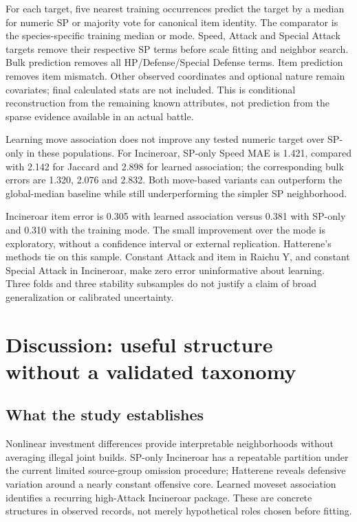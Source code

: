 \documentclass[10pt,a4paper]{article}
\begin{document}
For each target, five nearest training occurrences predict the target by a median for numeric SP or majority vote for canonical item identity. The comparator is the species-specific training median or mode. Speed, Attack and Special Attack targets remove their respective SP terms before scale fitting and neighbor search. Bulk prediction removes all HP/Defense/Special Defense terms. Item prediction removes item mismatch. Other observed coordinates and optional nature remain covariates; final calculated stats are not included. This is conditional reconstruction from the remaining known attributes, not prediction from the sparse evidence available in an actual battle.

\begin{table}[!ht]\centering\small
\caption{Three-fold grouped holdout errors. Numeric columns are mean absolute errors in SP units; the last column is a categorical item-identity error rate, not an SP error. Every method evaluates 13 Hatterene (13 groups), 197 Incineroar (192 groups) and 72 Raichu Y (70 groups) occurrences.}
\resizebox{\linewidth}{!}{\HoldoutTable}
\end{table}
Learning move association does not improve any tested numeric target over SP-only in these populations. For Incineroar, SP-only Speed MAE is 1.421, compared with 2.142 for Jaccard and 2.898 for learned association; the corresponding bulk errors are 1.320, 2.076 and 2.832. Both move-based variants can outperform the global-median baseline while still underperforming the simpler SP neighborhood.

Incineroar item error is 0.305 with learned association versus 0.381 with SP-only and 0.310 with the training mode. The small improvement over the mode is exploratory, without a confidence interval or external replication. Hatterene's methods tie on this sample. Constant Attack and item in Raichu Y, and constant Special Attack in Incineroar, make zero error uninformative about learning. Three folds and three stability subsamples do not justify a claim of broad generalization or calibrated uncertainty.
\clearpage

\section{Discussion: useful structure without a validated taxonomy}
\subsection{What the study establishes}
Nonlinear investment differences provide interpretable neighborhoods without averaging illegal joint builds. SP-only Incineroar has a repeatable partition under the current limited source-group omission procedure; Hatterene reveals defensive variation around a nearly constant offensive core. Learned moveset association identifies a recurring high-Attack Incineroar package. These are concrete structures in observed records, not merely hypothetical roles chosen before fitting.
\end{document}
